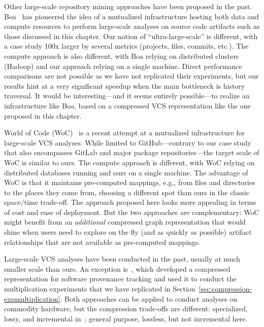 Other large-scale repository mining approaches have been proposed in the past.
%
Boa~\cite{dyer2013boa} has pioneered the idea of a mutualized infrastructure
hosting both data and compute resources to perform large-scale analyses on
source code artifacts such as those discussed in this chapter. Our notion of
``ultra-large-scale'' is different, with a case study 100x larger by several
metrics (projects, files, commits, etc.). The compute approach is also
different, with Boa relying on distributed clusters (Hadoop) and our approach
relying on a single machine. Direct performance comparisons are not possible as
we have not replicated their experiments, but our results hint at a very
significant speedup when the main bottleneck is history traversal. It would be
interesting---and it seems entirely possible---to realize an infrastructure
like Boa, based on a compressed VCS representation like the one proposed in
this chapter.

World of Code (WoC)~\cite{mockus2019woc} is a recent attempt at a mutualized
infrastructure for large-scale VCS analyses. While limited to GitHub---contrary
to our case study that also encompasses GitLab and major package
repositories---the target scale of WoC is similar to ours. The compute approach
is different, with WoC relying on distributed databases running and ours on a
single machine. The advantage of WoC is that it maintains pre-computed
mappings, e.g., from files and directories to the places they come from,
choosing a different spot than ours in the classic space/time trade-off. The
approach proposed here looks more appealing in terms of cost and ease of
deployment. But the two approaches are complementary: WoC might benefit from an
\emph{additional} compressed graph representation that would shine when users
need to explore on the fly (and as quickly as possible) artifact relationships
that are not available as pre-computed mappings.

Large-scale VCS analyses have been conducted in the past, usually at much
smaller scale than ours. An exception is~\cite{swh-provenance-tr}, which
developed a compressed representation for software provenance tracking and used
it to conduct the multiplication experiments that we have replicated in
Section~\ref{sec:compression-expmultiplication}. Both approaches can be applied
to conduct analyses on commodity hardware, but the compression trade-offs are
different: specialized, lossy, and incremental in~\cite{swh-provenance-tr};
general purpose, lossless, but not incremental here.

